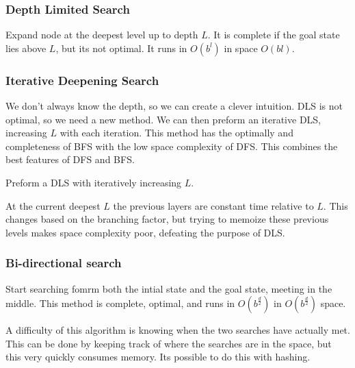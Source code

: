 \documentclass{chezarticle}
\begin{document}
\subsubsection{Depth Limited Search}
\begin{algorithm}
Expand node at the deepest level up to depth $L$. It is complete if the goal state lies above $L$, but its not optimal. It runs in $O(b^l)$ in space $O(bl)$.
\end{algorithm}
\subsubsection{Iterative Deepening Search}
We don't always know the depth, so we can create a clever intuition. DLS is not optimal, so we need a new method. We can then preform an iterative DLS, increasing $L$ with each iteration. This method has the optimally and completeness of BFS with the low space complexity of DFS. This combines the best features of DFS and BFS. 
\begin{algorithm}
Preform a DLS with iteratively increasing $L$. 
\end{algorithm}
At the current deepest $L$ the previous layers are constant time relative to $L$. This changes based on the branching factor, but trying to memoize these previous levels makes space complexity poor, defeating the purpose of DLS. 
\subsubsection{Bi-directional search}
\begin{algorithm}
Start searching fomrm both the intial state and the goal state, meeting in the middle. This method is complete, optimal, and runs in $O(b^{\frac{d}{2}})$ in $O(b^{\frac{d}{2}})$ space.
\end{algorithm}
A difficulty of this algorithm is knowing when the two searches have actually met. This can be done by keeping track of where the searches are in the space, but this very quickly consumes memory. Its possible to do this with hashing.
\end{document}

